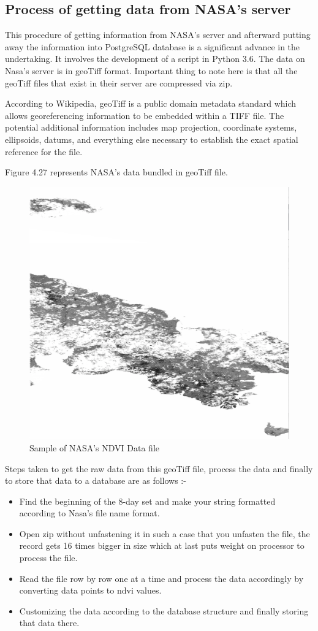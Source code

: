 \subsection{Process of getting data from NASA's server}

This procedure of getting information from NASA's server and afterward putting away the information into PostgreSQL database is a significant advance in the undertaking. It involves the development of a script in Python 3.6. The data on Nasa's server is in \gls{geoTiff} format. Important thing to note here is that all the \gls{geoTiff} files that exist in their server are compressed via zip.


According to Wikipedia, \gls{geoTiff} is a public domain metadata standard which allows georeferencing information to be embedded within a TIFF file. The potential additional information includes map projection, coordinate systems, ellipsoids, datums, and everything else necessary to establish the exact spatial reference for the file.

Figure 4.27 represents NASA's data bundled in \gls{geoTiff} file.

    \begin{figure}[H]
            \centering
            \includegraphics[width=0.35\linewidth]{figures/ch4/geotiff.png}
            \caption{\label{fig:geotiff} Sample of NASA's NDVI Data file}
    \end{figure}

    Steps taken to get the raw data from this \gls{geoTiff} file, process the data and finally to store that data to a database are as follows :-
    
    \begin{itemize}
        \item Find the beginning of the 8-day set and make your string formatted according to Nasa's file name format.
        
        \item Open zip without unfastening it in such a case that you unfasten the file, the record gets 16 times bigger in size which at last puts weight on processor to process the file.
        
        \item Read the file row by row one at a time and process the data accordingly by converting data points to \gls{ndvi} values.
        
        \item Customizing the data according to the database structure and finally storing that data there.
    \end{itemize}

